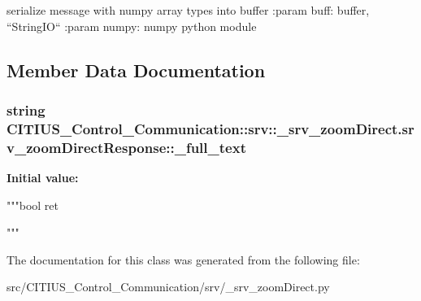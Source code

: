 \begin{DoxyVerb}
serialize message with numpy array types into buffer
:param buff: buffer, ``StringIO``
:param numpy: numpy python module
\end{DoxyVerb}
 

\subsection{\-Member \-Data \-Documentation}
\hypertarget{class_c_i_t_i_u_s___control___communication_1_1srv_1_1__srv__zoom_direct_1_1srv__zoom_direct_response_a74f2ced3a66e57a5866705a98d729845}{
\subsubsection[{\-\_\-full\-\_\-text}]{\setlength{\rightskip}{0pt plus 5cm}string \-C\-I\-T\-I\-U\-S\-\_\-\-Control\-\_\-\-Communication\-::srv\-::\-\_\-srv\-\_\-zoom\-Direct.\-srv\-\_\-zoom\-Direct\-Response\-::\-\_\-full\-\_\-text}}\label{class_c_i_t_i_u_s___control___communication_1_1srv_1_1__srv__zoom_direct_1_1srv__zoom_direct_response_a74f2ced3a66e57a5866705a98d729845}
{\bfseries \-Initial value\-:}
\begin{DoxyCode}
"""bool ret


"""
\end{DoxyCode}


\-The documentation for this class was generated from the following file\-:\begin{DoxyCompactItemize}
\item 
src/\-C\-I\-T\-I\-U\-S\-\_\-\-Control\-\_\-\-Communication/srv/\-\_\-srv\-\_\-zoom\-Direct.\-py\end{DoxyCompactItemize}
